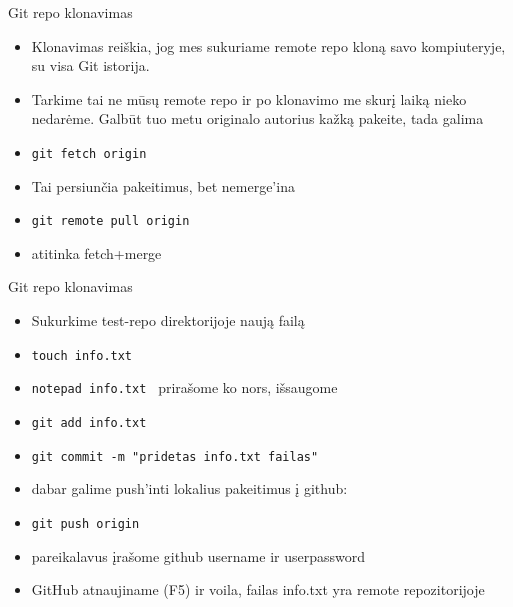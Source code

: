 \documentclass[11pt,xcolor=table]{beamer}
\begin{document}

\begin{frame}{Git repo klonavimas}
\begin{itemize}
\item Klonavimas reiškia, jog mes sukuriame remote repo kloną savo kompiuteryje, su visa Git istorija.
\item Tarkime tai ne mūsų remote repo ir po klonavimo me skurį laiką nieko nedarėme. Galbūt tuo metu  originalo autorius kažką pakeite, tada galima
\item \colorbox{listinggray}{\lstinline|git fetch origin|}
\item Tai persiunčia pakeitimus, bet nemerge'ina
\item \colorbox{listinggray}{\lstinline|git remote pull origin|}
\item atitinka fetch+merge
\end{itemize}
\end{frame}


\begin{frame}{Git repo klonavimas}
\begin{itemize}
\item Sukurkime test-repo direktorijoje naują failą
\item \colorbox{listinggray}{\lstinline|touch info.txt|}
\item \colorbox{listinggray}{\lstinline|notepad info.txt |} prirašome ko nors, išsaugome
\item \colorbox{listinggray}{\lstinline|git add info.txt|}
\item \colorbox{listinggray}{\lstinline|git commit -m "pridetas info.txt failas"|}
\item dabar galime push'inti lokalius pakeitimus į github:
\item \colorbox{listinggray}{\lstinline|git push origin |}
\item pareikalavus įrašome github username ir userpassword
\item GitHub atnaujiname (F5) ir voila, failas info.txt yra remote repozitorijoje
\end{itemize}
\end{frame}

\end{document}
